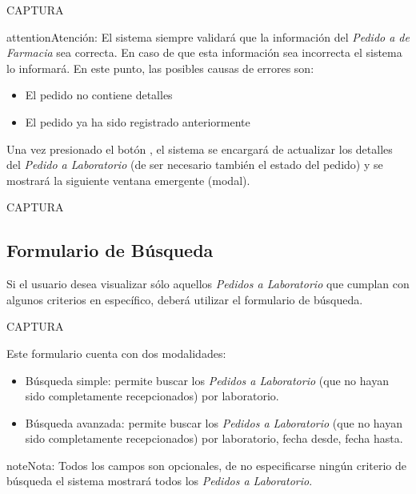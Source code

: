 \documentclass[a4paper,10pt,spanish]{sphinxmanual}
\begin{document}
CAPTURA

\begin{notice}{attention}{Atención:}
El sistema siempre validará que la información del \emph{Pedido a de Farmacia} sea correcta. En caso de que esta información sea incorrecta el sistema lo informará.
En este punto, las posibles causas de errores son:
\begin{itemize}
\item {} 
El pedido no contiene detalles

\item {} 
El pedido ya ha sido registrado anteriormente

\end{itemize}
\end{notice}

Una vez presionado el botón , el sistema se encargará de actualizar los detalles del \emph{Pedido a Laboratorio} (de ser necesario también el estado del pedido) y se mostrará la siguiente ventana emergente (modal).

CAPTURA


\subsection{Formulario de Búsqueda}
\label{receppedidosdelab:formulario-busqueda-rpl}\label{receppedidosdelab:formulario-de-busqueda}
Si el usuario desea visualizar sólo aquellos \emph{Pedidos a Laboratorio} que cumplan con algunos criterios en específico, deberá utilizar el formulario de búsqueda.

CAPTURA

Este formulario cuenta con dos modalidades:
\begin{itemize}
\item {} 
Búsqueda simple: permite buscar los \emph{Pedidos a Laboratorio} (que no hayan sido completamente recepcionados) por laboratorio.

\item {} 
Búsqueda avanzada: permite buscar los \emph{Pedidos a Laboratorio} (que no hayan sido completamente recepcionados) por laboratorio, fecha desde, fecha hasta.

\end{itemize}

\begin{notice}{note}{Nota:}
Todos los campos son opcionales, de no especificarse ningún criterio de búsqueda el sistema mostrará todos los \emph{Pedidos a Laboratorio}.
\end{notice}
\end{document}
